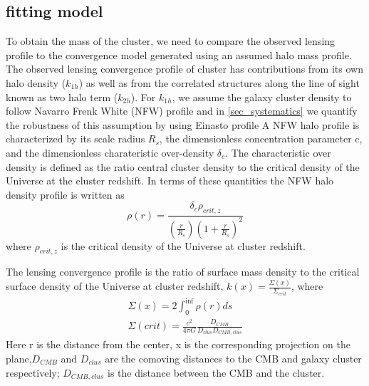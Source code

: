  \subsection{fitting model}
To obtain the mass of the cluster, we need to compare the observed lensing profile to the convergence model generated using an assumed halo mass profile.
 The observed lensing convergence profile of cluster has contributions from its own halo density ($k_{1h}$) as well as from the correlated structures along the line of sight known as two halo term ($k_{2h}$).
 For $k_{1h}$, we assume the galaxy cluster density to follow Navarro Frenk White (NFW) profile and in \ref{sec_systematics} we quantify the robustness of this assumption by using Einasto profile \citep{Einasto}
 A NFW halo profile is characterized by its scale radius $R_{s}$, the dimensionless concentration parameter c, and the dimensionless charateristic over-density $\delta_{c}$.
 The characteristic over density is defined as the ratio central cluster density to the critical density of the Universe at the cluster redshift.
 In terms of these quantities the NFW halo density profile is written as 
 \begin{equation}
 \rho(r) = \frac{\delta_{c}\rho_{crit,z}}{(\frac{r}{R_{s}})(1 + \frac{r}{R_{s}})^{2}}
 \end{equation} 
 where $\rho_{crit,z}$ is the critical density of the Universe at cluster redshift.
 
 The lensing convergence profile is the ratio of surface mass density to the critical surface density of the Universe at cluster redshift, $k(x) = \frac{\Sigma(x)}{\Sigma_{crit}}$, where
 \begin{eqnarray}
 \Sigma(x) = 2 \int^{\inf}_{0} \rho(r) ds\\
 \Sigma(crit) = \frac{c^{2}}{4\pi G} \frac{D_{CMB}}{D_{clus} D_{CMB,clus}} 
 \end{eqnarray} 
Here r is the distance from the center, x is the corresponding projection on the plane,$D_{CMB}$ and $D_{clus}$ are the comoving distances to the CMB and galaxy cluster respectively; $D_{CMB,clus}$ is the distance between the CMB and the cluster.

